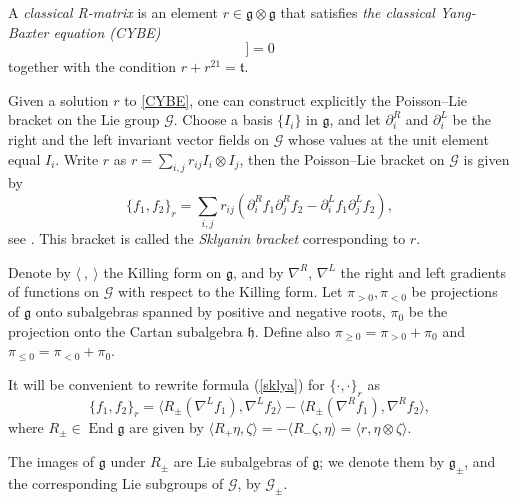 \documentclass{amsart}
\theoremstyle{definition}
\theoremstyle{remark}
\numberwithin{equation}{section}
\numberwithin{theorem}{section}
\begin{document}
A {\em classical R-matrix} is an element $r\in {\mathfrak g}\otimes{\mathfrak g}$ that satisfies
{\em the classical Yang-Baxter equation (CYBE)} 
\begin{equation}
[[r, r]] =0
\label{CYBE}
\end{equation}
together with the condition $r + r^{21} = \mathfrak{t}$.

Given a solution $r$ to \eqref{CYBE}, one can construct explicitly the Poisson--Lie bracket on the Lie group ${{\mathcal G}}$.
Choose a basis $\{I_i\}$ in ${\mathfrak g}$, and let $\partial^R_i$ and $\partial^L_i$ be the right
and the left invariant vector fields on ${{\mathcal G}}$ whose values at the unit element equal $I_i$. Write $r$ as
$r=\sum_{i,j} r_{ij}I_i\otimes I_j$, then the Poisson--Lie bracket on ${{\mathcal G}}$ is given by
\begin{equation}\label{sklya}
\{f_1,f_2\}_r=\sum_{i,j}r_{ij}\left(\partial^R_i f_1\partial^R_j f_2-
\partial^L_i f_1\partial^L_j f_2\right),
\end{equation}
see \cite[Proposition 4.1.4]{KoSo}. This bracket is called the {\it Sklyanin bracket\/} corresponding to $r$.

Denote by 
$\langle \ , \ \rangle$ the Killing form on ${\mathfrak g}$, and by 
$\nabla^R$, $\nabla^L$ the right and
left gradients of functions on ${{\mathcal G}}$ with respect to the Killing form. Let $\pi_{>0}, \pi_{<0}$ be projections of  
${\mathfrak g}$ onto subalgebras spanned by positive and negative roots, $\pi_0$ be the projection onto the Cartan 
subalgebra ${\mathfrak h}$. Define also $\pi_{\geq 0}=\pi_{>0} + \pi_0$ and $\pi_{\leq 0}=\pi_{<0} + \pi_0$.

It will be convenient to rewrite formula (\ref{sklya}) for ${{\{\cdot,\cdot\}}}_r$ as
\begin{equation}
\{f_1,f_2\}_r = \langle R_\pm(\nabla^L f_1), \nabla^L f_2 \rangle - \langle R_\pm(\nabla^R f_1), \nabla^R f_2 \rangle,
\label{sklyabra}
\end{equation}
where $R_\pm\in {\operatorname{End}}{\mathfrak g}$ are given by $\langle R_+ \eta, \zeta \rangle =
- \langle R_- \zeta, \eta \rangle =\langle r, \eta\otimes\zeta \rangle$.

The images of ${\mathfrak g}$ under $R_\pm$ are Lie subalgebras of ${\mathfrak g}$; we denote them by ${\mathfrak g}_\pm$,
and the corresponding Lie subgroups of ${{\mathcal G}}$, by ${{\mathcal G}}_\pm$.
\end{document}
